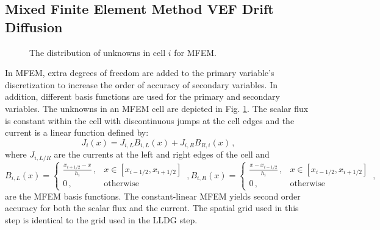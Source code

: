 
\subsection{Mixed Finite Element Method VEF Drift Diffusion}
\begin{figure}
	\centering
	 
	\caption{The distribution of unknowns in cell $i$ for MFEM. }
	\label{fig:mfem_grid}
\end{figure}
In MFEM, extra degrees of freedom are added to the primary variable's discretization to increase the order of accuracy of secondary variables. In addition, different basis functions are used for the primary and secondary variables. The unknowns in an MFEM cell are depicted in Fig. \ref{fig:mfem_grid}. The scalar flux is constant within the cell with discontinuous jumps at the cell edges and the current is a linear function defined by: 
	\begin{equation} \label{eq:MFEM_current}
		J_i(x) = J_{i,L} B_{i,L}(x) + J_{i,R} B_{R,i}(x) \,, 
	\end{equation} 
where $J_{i,L/R}$ are the currents at the left and right edges of the cell and 
	\begin{subequations}
		\begin{equation}
			B_{i,L}(x) = \begin{cases}
				\frac{x_{i+1/2} - x}{h_i} \,, & x \in [x_{i-1/2}, x_{i+1/2}] \\ 
				0 \,, & \text{otherwise}
			\end{cases} \,,
		\end{equation}
		\begin{equation}
			B_{i,R}(x) = \begin{cases}
				\frac{x - x_{i-1/2}}{h_i} \,, & x \in [x_{i-1/2}, x_{i+1/2}] \\ 
				0 \,, & \text{otherwise}
			\end{cases} \,,
		\end{equation}
	\end{subequations}
are the MFEM basis functions. The constant-linear MFEM yields second order accuracy for both the scalar flux and the current. The spatial grid used in this step is identical to the grid used in the LLDG \SN step. 

